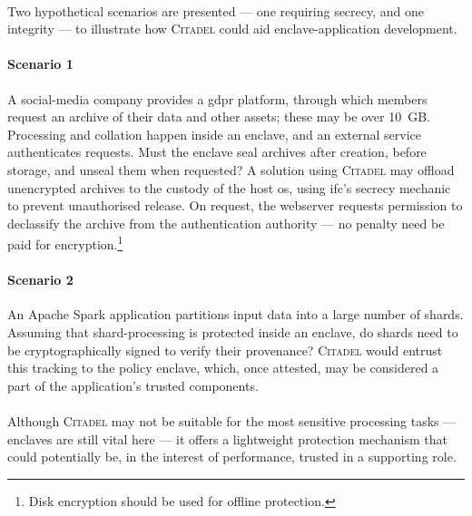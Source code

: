 \paragraph{} Two hypothetical scenarios are presented --- one requiring secrecy, and one integrity --- to illustrate how \textsc{Citadel} could aid enclave-application development.

\paragraph{Scenario 1} A social-media company provides a \acrshort{gdpr} platform, through which members request an archive of their data and other assets; these may be over 10~GB. Processing and collation happen inside an enclave, and an external service authenticates requests. Must the enclave seal archives after creation, before storage, and unseal them when requested? A solution using \textsc{Citadel} may offload unencrypted archives to the custody of the host \acrshort{os}, using \acrshort{ifc}'s secrecy mechanic to prevent unauthorised release. On request, the webserver requests permission to declassify the archive from the authentication authority --- no penalty need be paid for encryption.\footnote{Disk encryption should be used for offline protection.}


\paragraph{Scenario 2} An Apache Spark application partitions input data into a large number of shards. Assuming that shard-processing is protected inside an enclave, do shards need to be cryptographically signed to verify their provenance? \textsc{Citadel} would entrust this tracking to the policy enclave, which, once attested, may be considered a part of the application's trusted components.

\paragraph{} Although \textsc{Citadel} may not be suitable for the most sensitive processing tasks --- enclaves are still vital here --- it offers a lightweight protection mechanism that could potentially be, in the interest of performance, trusted in a supporting role.
